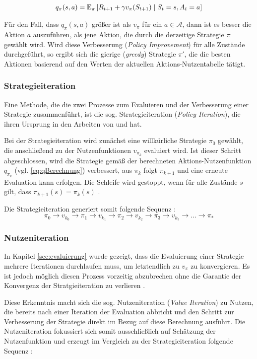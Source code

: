 \begin{equation}\label{eq:qBerechnung}
    \begin{aligned}
        q_\pi(s,a) = \operatorname{\mathbb{E}}_\pi\left[ R_{t+1} + \gamma v_\pi(S_{t+1}) \mid S_t = s, A_t=a\right]
    \end{aligned}
\end{equation}

Für den Fall, dass $q_\pi(s,a)$ größer ist als $v_\pi$ für ein $a \in \mathcal{A}$, dann ist es besser die Aktion $a$ auszuführen, als jene Aktion, die durch die derzeitige Strategie $\pi$ gewählt wird. Wird diese Verbesserung (\textit{Policy Improvement}) für alle Zustände durchgeführt, so ergibt sich die gierige (\textit{greedy}) Strategie $\pi'$, die die besten Aktionen basierend auf den Werten der aktuellen Aktions-Nutzentabelle tätigt.

\subsubsection{Strategieiteration}
Eine Methode, die die zwei Prozesse zum Evaluieren und der Verbesserung einer Strategie zusammenführt, ist die sog. Strategieiteration (\textit{Policy Iteration}), die ihren Ursprung in den Arbeiten von \cite{bellman1957dynamic} und \cite{howard1960dynamic} hat. 
\par 
Bei der Strategieiteration wird zunächst eine willkürliche Strategie $\pi_0$ gewählt, die anschließend zu der Nutzenfunktionen $v_{\pi_k}$ evaluiert wird. Ist dieser Schritt abgeschlossen, wird die Strategie gemäß der berechneten Aktions-Nutzenfunktion $q_{\pi_k}$ (vgl. \ref{eq:qBerechnung}) verbessert, aus $\pi_k$ folgt $\pi_{k+1}$ und eine erneute Evaluation kann erfolgen. Die Schleife wird gestoppt, wenn für alle Zustände $s$ gilt, dass $\pi_{k+1}(s) = \pi_k(s)$ \cite[S.~22]{Wiering}. 
\par 
Die Strategieiteration generiert somit folgende Sequenz \cite[S.~22]{Wiering}:
\begin{equation}\label{eq:policyItSeq}
\pi_0 \rightarrow v_{k_0} \rightarrow  \pi_1 \rightarrow v_{k_1} \rightarrow  \pi_2 \rightarrow v_{k_2}\rightarrow  \pi_3 \rightarrow v_{k_3}\rightarrow \dots \rightarrow \pi_*
\end{equation}

\subsubsection{Nutzeniteration}\label{sec:Nutzeniteration}
In Kapitel \ref{sec:evaluierung} wurde gezeigt, dass die Evaluierung einer Strategie mehrere Iterationen durchlaufen muss, um letztendlich zu $v_\pi$ zu konvergieren. Es ist jedoch möglich diesen Prozess vorzeitig abzubrechen ohne die Garantie der Konvergenz der Stratgieiteration zu verlieren \cite[S.~82]{Sutton1998}. 
\par 
Diese Erkenntnis macht sich die sog. Nutzeniteration (\textit{Value Iteration}) zu Nutzen, die bereits nach einer Iteration der Evaluation abbricht und den Schritt zur Verbesserung der Strategie direkt im Bezug auf diese Berechnung ausführt. Die Nutzeniteration fokussiert sich somit ausschließlich auf Schätzung der Nutzenfunktion und erzeugt im Vergleich zu der Strategieiteration folgende Sequenz \cite[S.~23]{Wiering}:

